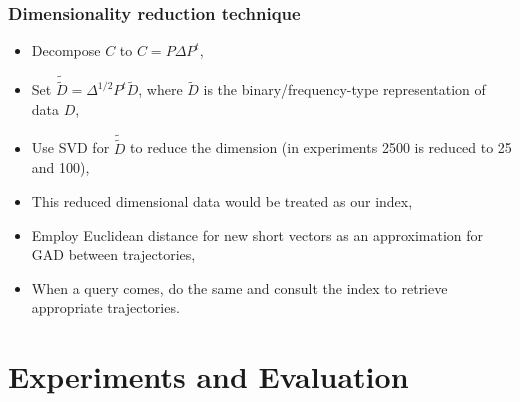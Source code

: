 \documentclass{beamer}
\begin{document}
\begin{frame}
\begin{block}{} 
\frametitle{Dimensionality reduction technique}  

\begin{itemize}
\item Decompose $C$ to {\color{orange} $C = P \Delta P^t$},  \vspace{1mm} \pause
\item Set $\tilde{\tilde{D}} = \Delta^{1/2} P^t \tilde{D}$, where $\tilde{D}$ is the binary/frequency-type representation of data $D$, \pause  \vspace{1mm}
\item Use {\color{orange} SVD} for $\tilde{\tilde{D}} $ to reduce the dimension (in experiments 2500 is reduced to 25 and 100), \pause  \vspace{1mm}
\item This reduced dimensional data would be treated as our {\color{orange} index}, \pause  \vspace{1mm}
\item Employ {\color{orange} Euclidean distance} for new short vectors as an approximation for GAD between trajectories, \pause  \vspace{1mm}
\item When a query comes, do the same and consult the index to retrieve appropriate trajectories.
\end{itemize}
\end{block}
\end{frame}




\section{Experiments and Evaluation}
\end{document}
